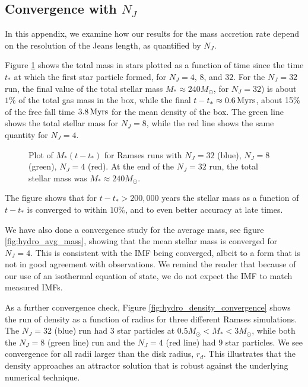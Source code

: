 \documentclass[../dissertation.tex]{subfiles}
\begin{document}
\subsection{Convergence with $N_J$}

In this appendix, we examine how our results for the mass accretion rate depend on the resolution of the Jeans length, as quantified by $N_J$. 

Figure \ref{fig:hydro_Convergence} shows the total mass in stars plotted as a function of time since the time $t_*$ at which the first star particle formed, for $N_J=4,\,8$, and $32$.
For the $N_J=32$ run, the final value of the total stellar mass $M_*\approx 240M_\odot$, for $N_J =32$) 
is about $1\%$ of the total gas mass in the box, while the final $t-t_*\approx 0.6\,\rm Myrs$, 
about 15\% of the free fall time $3.8\,\rm Myrs$ for the mean density of the box. 
The green line shows the total stellar mass for $N_J = 8$, while the red line shows the same quantity for $N_J = 4$.

\begin{figure}[htb]
\caption[Hydro Convergence in Jeans Length]{Plot of $M_*(t-t_*)$ for Ramses runs with $N_J = 32$ (blue), $N_J = 8$ (green), $N_J = 4$ (red). At the end of the $N_J = 32$ run, the total stellar mass was $M_*\approx 240M_\odot$. \label{fig:hydro_Convergence}}
\end{figure}

The figure shows that for $t - t_* > 200,000$ years the stellar mass as a function of $t-t_*$ is converged to within $10 \%$, and to even better accuracy at late times.

We have also done a convergence study for the average mass, see figure \ref{fig:hydro_avg_mass}, showing that the mean stellar mass is converged for $N_J=4$. This is consistent with the IMF being converged, albeit to a form that is not in good agreement with observations. We remind the reader that because of our use of an isothermal equation of state, we do not expect the IMF to match measured IMFs.

As a further convergence check, Figure \ref{fig:hydro_density_convergence} shows the run of density as a function of radius for three different Ramses simulations. The $N_J = 32$ (blue) run had $3$ star particles at $0.5M_\odot<M_*<3 M_\odot$, while both the $N_J = 8$ (green line) run and the $N_J = 4$ (red line) had $9$ star particles.
We see convergence for all radii larger than the disk radius, $r_d$.  This illustrates that the density approaches an attractor solution that is robust against the underlying numerical technique. 
\end{document}
